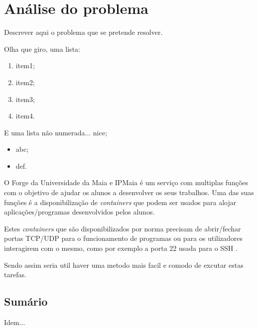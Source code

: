 \chapter{Análise do problema}
\label{cap:problem}

Descrever aqui o problema que se pretende resolver.


Olha que giro, uma lista:

\begin{enumerate}
    \item item1;
    \item item2;
    \item item3;
    \item item4.
\end{enumerate}


E uma lista não numerada... nice;

\begin{itemize}
    \item abc;
    \item def.
\end{itemize}

O Forge da Universidade da Maia e IPMaia é um serviço com multiplas funções com 
o objetivo de ajudar os alunos a desenvolver os seus trabalhos. Uma das suas 
funções é a disponibilização de \textit{containers} que podem ser usados
para alojar aplicações/programas desenvolvidos pelos alunos.

Estes \textit{containers} que são disponibilizados por norma precisam de 
abrir/fechar portas TCP/UDP para o funcionamento de programas ou para os
utilizadores interagirem com o mesmo, como por exemplo a porta 22 usada para o 
SSH \cite{rfc4253}.



Sendo assim seria util haver uma metodo mais facil e comodo de excutar estas
tarefas.



\section*{Sumário}

Idem... 